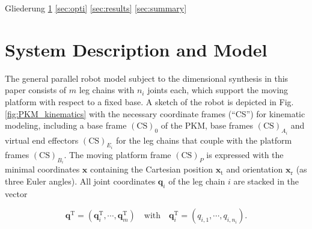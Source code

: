 \documentclass[fleqn,a4paper,10pt]{article}
\newcommand{\bm}[1]{\mathbf{#1}}
\renewcommand{\Phi}[1]{\varPhi{#1}}
\newcommand{\transp}[0]{{\mathrm{T}}}
\newcommand{\ks}[1]{{(\mathrm{CS})}_{#1}}
\renewenvironment{figure}
  {\par\vspace{6pt}\noindent\minipage{\linewidth}}
  {\endminipage\par\vspace{6pt}}
\begin{document}
\begin{multicols}{2}
Gliederung
\ref{sec:sysmdl}
\ref{sec:opti}
\ref{sec:results}
\ref{sec:summary}

\section{System Description and Model}
\label{sec:sysmdl}


\begin{figure}
\graphicspath{{./Bilder/}}
\centering

\label{fig:PKM_kinematics}
\end{figure}



The general parallel robot model subject to the dimensional synthesis in this paper consists of $m$ leg chains with $n_i$ joints each, which support the moving platform with respect to a fixed base.
A sketch of the robot is depicted in Fig.\,\ref{fig:PKM_kinematics} with the necessary coordinate frames (``CS'') for kinematic modeling, including a base frame $\ks{0}$ of the PKM, base frames $\ks{A_i}$ and virtual end effectors $\ks{E_i}$ for the leg chains  that couple with the platform frames $\ks{B_i}$.
The moving platform frame $\ks{P}$ is expressed with the minimal coordinates $\bm{x}$ containing the Cartesian position $\bm{x}_\mathrm{t}$ and orientation  $\bm{x}_\mathrm{r}$ (as three Euler angles).
All joint coordinates $\bm{q}_i$ of the leg chain $i$ are stacked in the vector

\begin{equation}
\bm{q}^\transp=(\bm{q}_{i}^\transp,\cdots,\bm{q}_{m}^\transp) \quad \mathrm{with}  \quad \bm{q}_i^\transp=(q_{i,1},\cdots,q_{i,n_i}).
\end{equation}


\end{multicols}
\end{document}
